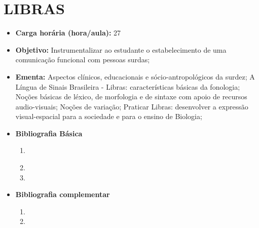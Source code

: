 \documentclass[11pt,fleqn]{book} %
\begin{document}
\section{LIBRAS}\label{5_libras}
\begin{itemize}
	\item \textbf{Carga horária (hora/aula):} 27
	\item \textbf{Objetivo:} Instrumentalizar ao estudante o estabelecimento de uma comunicação funcional com pessoas surdas;
	\item \textbf{Ementa:} 
	Aspectos clínicos, educacionais e sócio-antropológicos da surdez; 
	A Língua de Sinais Brasileira -	Libras: características básicas da fonologia;
	Noções básicas de léxico, de morfologia e de sintaxe com apoio de recursos audio-visuais; 
	Noções de variação; 
	Praticar Libras: desenvolver a expressão visual-espacial para a sociedade e para o ensino de Biologia;
	\item \textbf{Bibliografia Básica}
	\begin{enumerate}
		\item \cite{cartilha2012}
		\item 
		\item 
	\end{enumerate}
	\item \textbf{Bibliografia complementar}
	\begin{enumerate}
		\item 
		\item
	\end{enumerate}
\end{itemize}


\newpage
\end{document}
